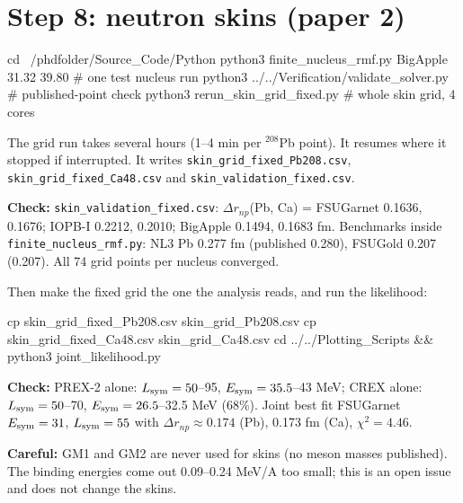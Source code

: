 \documentclass[11pt,a4paper]{article}
\newcommand{\Esym}{E_{\rm sym}}
\newcommand{\Lsym}{L_{\rm sym}}
\newcommand{\f}[1]{\texttt{#1}}
\newcommand{\ok}[1]{\par\noindent\textcolor{okc}{\textbf{Check:}} #1\par}
\newcommand{\warn}[1]{\par\noindent\textcolor{warnc}{\textbf{Careful:}} #1\par}
\begin{document}
\section{Step 8: neutron skins (paper 2)}
\begin{cmd}
cd ~/phdfolder/Source_Code/Python
python3 finite_nucleus_rmf.py BigApple 31.32 39.80        # one test nucleus run
python3 ../../Verification/validate_solver.py             # published-point check
python3 rerun_skin_grid_fixed.py                          # whole skin grid, 4 cores
\end{cmd}
The grid run takes several hours (1--4 min per $^{208}$Pb point). It resumes where it stopped if interrupted. It writes \f{skin\_grid\_fixed\_Pb208.csv}, \f{skin\_grid\_fixed\_Ca48.csv} and \f{skin\_validation\_fixed.csv}.

\ok{\f{skin\_validation\_fixed.csv}: $\Delta r_{np}$(Pb, Ca) = FSUGarnet 0.1636, 0.1676; IOPB-I 0.2212, 0.2010; BigApple 0.1494, 0.1683 fm. Benchmarks inside \f{finite\_nucleus\_rmf.py}: NL3 Pb 0.277 fm (published 0.280), FSUGold 0.207 (0.207). All 74 grid points per nucleus converged.}

Then make the fixed grid the one the analysis reads, and run the likelihood:
\begin{cmd}
cp skin_grid_fixed_Pb208.csv skin_grid_Pb208.csv
cp skin_grid_fixed_Ca48.csv  skin_grid_Ca48.csv
cd ../../Plotting_Scripts && python3 joint_likelihood.py
\end{cmd}
\ok{PREX-2 alone: $\Lsym=50$--95, $\Esym=35.5$--43 MeV; CREX alone: $\Lsym=50$--70, $\Esym=26.5$--32.5 MeV (68\%). Joint best fit FSUGarnet $\Esym=31$, $\Lsym=55$ with $\Delta r_{np}\approx0.174$ (Pb), 0.173 fm (Ca), $\chi^2=4.46$.}
\warn{GM1 and GM2 are never used for skins (no meson masses published). The binding energies come out 0.09--0.24 MeV/A too small; this is an open issue and does not change the skins.}

\end{document}
